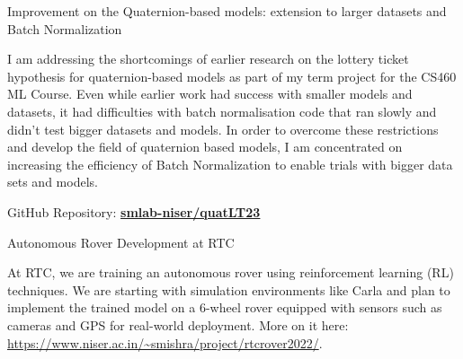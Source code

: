 	\cvachievement
	{\faBook}
	{Improvement on the Quaternion-based models: extension to larger datasets and Batch Normalization}
	{}
	\vspace{-8mm}
	\begin{justify}
		I am addressing the shortcomings of earlier research on the lottery ticket hypothesis for quaternion-based models as part of my term project for the CS460 ML Course. Even while earlier work had success with smaller models and datasets, it had difficulties with batch normalisation code that ran slowly and didn't test bigger datasets and models. In order to overcome these restrictions and develop the field of quaternion based models, I am concentrated on increasing the efficiency of Batch Normalization to enable trials with bigger data sets and models.

		\vspace{3mm}

		\noindent GitHub Repository: \href{https://github.com/smlab-niser/quatLT23}{\textbf{smlab-niser/quatLT23}}
	\end{justify}

	
	\cvachievement
	{\faUsers}
	{Autonomous Rover Development at RTC}
	{}
	\vspace{-8mm}
	\begin{justify}
		At RTC, we are training an autonomous rover using reinforcement learning (RL) techniques. We are starting with simulation environments like Carla and plan to implement the trained model on a 6-wheel rover equipped with sensors such as cameras and GPS for real-world deployment.
		More on it here: \url{https://www.niser.ac.in/~smishra/project/rtcrover2022/}.
	\end{justify}